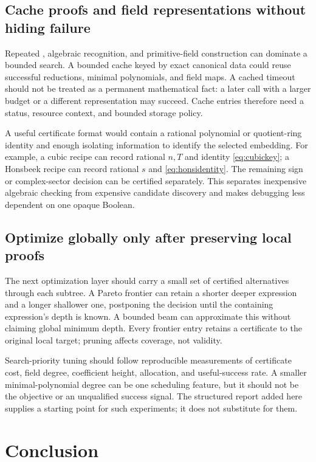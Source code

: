 \documentclass[11pt,letterpaper]{article}
\newcommand{\code}[1]{\texttt{\detokenize{#1}}}
\theoremstyle{definition}
\theoremstyle{remark}
\begin{document}
\subsection{Cache proofs and field representations without hiding failure}

Repeated \code{RootReduce}, algebraic recognition, and primitive-field construction can dominate a bounded search. A bounded cache keyed by exact canonical data could reuse successful reductions, minimal polynomials, and field maps. A cached timeout should not be treated as a permanent mathematical fact: a later call with a larger budget or a different representation may succeed. Cache entries therefore need a status, resource context, and bounded storage policy.

A useful certificate format would contain a rational polynomial or quotient-ring identity and enough isolating information to identify the selected embedding. For example, a cubic recipe can record rational $n,T$ and identity \eqref{eq:cubickey}; a Honsbeek recipe can record rational $s$ and \eqref{eq:honsidentity}. The remaining sign or complex-sector decision can be certified separately. This separates inexpensive algebraic checking from expensive candidate discovery and makes debugging less dependent on one opaque Boolean.

\subsection{Optimize globally only after preserving local proofs}

The next optimization layer should carry a small set of certified alternatives through each subtree. A Pareto frontier can retain a shorter deeper expression and a longer shallower one, postponing the decision until the containing expression's depth is known. A bounded beam can approximate this without claiming global minimum depth. Every frontier entry retains a certificate to the original local target; pruning affects coverage, not validity.

Search-priority tuning should follow reproducible measurements of certificate cost, field degree, coefficient height, allocation, and useful-success rate. A smaller minimal-polynomial degree can be one scheduling feature, but it should not be the objective or an unqualified success signal. The structured report added here supplies a starting point for such experiments; it does not substitute for them.

\section{Conclusion}
\end{document}
